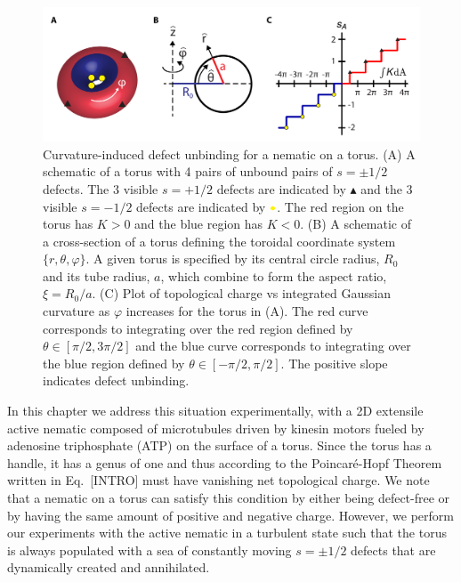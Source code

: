 \begin{figure}
  \includegraphics{figures/C3/Ch3-Figs_EqDefs.png}
  \caption{Curvature-induced defect unbinding for a nematic on a torus. (A) A schematic of a torus with 4 pairs of unbound pairs of $s = \pm 1/2$ defects. The 3 visible $s=+1/2$ defects are indicated by $\blacktriangle$ and the 3 visible $s = -1/2$ defects are indicated by ${\color{yellow} \bullet}$.
  The red region on the torus has $K >0$ and the blue region has $K<0$.
  (B) A schematic of a cross-section of a torus defining the toroidal coordinate system $\{r, \theta, \varphi \}$.
  A given torus is specified by its central circle radius, $R_0$ and its tube radius, $a$, which combine to form the aspect ratio, $\xi = R_0/a$.
  (C) Plot of topological charge vs integrated Gaussian curvature as $\varphi$ increases for the torus in (A).
  The red curve corresponds to integrating over the red region defined by $\theta \in [\pi/2,3 \pi/2]$ and the blue curve corresponds to integrating over the blue region defined by $\theta \in [-\pi/2,\pi/2]$. The positive slope indicates defect unbinding.}\label{f:3-EqDefs}
\end{figure}

In this chapter we address this situation experimentally, with a 2D extensile active nematic composed of microtubules driven by kinesin motors fueled by adenosine triphosphate (ATP) on the surface of a torus.
Since the torus has a handle, it has a genus of one and thus according to the Poincar\'e-Hopf Theorem written in Eq.~[INTRO] must have vanishing net topological charge.
We note that a nematic on a torus can satisfy this condition by either being defect-free or by having the same amount of positive and negative charge.
However, we perform our experiments with the active nematic in a turbulent state such that the torus is always populated with a sea of constantly moving $s = \pm 1/2$ defects that are dynamically created and annihilated.

